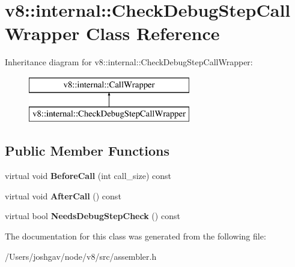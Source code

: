 \hypertarget{classv8_1_1internal_1_1_check_debug_step_call_wrapper}{}\section{v8\+:\+:internal\+:\+:Check\+Debug\+Step\+Call\+Wrapper Class Reference}
\label{classv8_1_1internal_1_1_check_debug_step_call_wrapper}
Inheritance diagram for v8\+:\+:internal\+:\+:Check\+Debug\+Step\+Call\+Wrapper\+:\begin{figure}[H]
\begin{center}
\leavevmode
\includegraphics[height=2.000000cm]{classv8_1_1internal_1_1_check_debug_step_call_wrapper}
\end{center}
\end{figure}
\subsection*{Public Member Functions}
\begin{DoxyCompactItemize}
\item 
virtual void {\bfseries Before\+Call} (int call\+\_\+size) const \hypertarget{classv8_1_1internal_1_1_check_debug_step_call_wrapper_a1841c921542efd7e717f905d69e9a2a4}{}\label{classv8_1_1internal_1_1_check_debug_step_call_wrapper_a1841c921542efd7e717f905d69e9a2a4}

\item 
virtual void {\bfseries After\+Call} () const \hypertarget{classv8_1_1internal_1_1_check_debug_step_call_wrapper_a8213f8cd4fc717359af80c17e667d0d4}{}\label{classv8_1_1internal_1_1_check_debug_step_call_wrapper_a8213f8cd4fc717359af80c17e667d0d4}

\item 
virtual bool {\bfseries Needs\+Debug\+Step\+Check} () const \hypertarget{classv8_1_1internal_1_1_check_debug_step_call_wrapper_ac07f53532a921e77ed05b62e06a61265}{}\label{classv8_1_1internal_1_1_check_debug_step_call_wrapper_ac07f53532a921e77ed05b62e06a61265}

\end{DoxyCompactItemize}


The documentation for this class was generated from the following file\+:\begin{DoxyCompactItemize}
\item 
/\+Users/joshgav/node/v8/src/assembler.\+h\end{DoxyCompactItemize}
